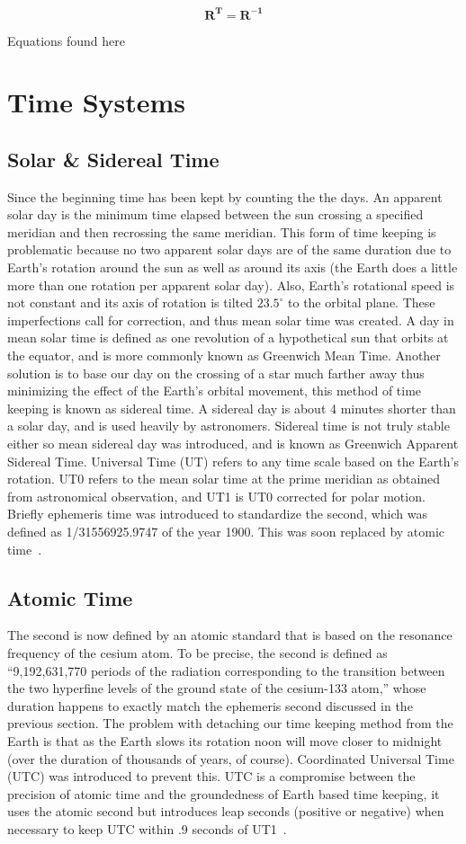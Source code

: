 \[ \mathbf{R^{T}}=\mathbf{R^{-1}} \]

Equations found  here~\cite[pp. 81-82]{battin:imma}

\section{Time Systems}
\subsection{Solar \& Sidereal Time}
Since the  beginning time has been kept by counting the the days. An apparent solar day is the minimum time elapsed between the sun crossing a specified meridian and then recrossing the same meridian. This form of time keeping is problematic because no two apparent solar days are of the same duration due to Earth's rotation around the sun as well as around its axis (the Earth does a little more than one rotation per apparent solar day). Also, Earth's rotational speed is not constant and its axis of rotation is tilted $23.5^{\circ}$ to the orbital plane. These imperfections call for correction, and thus mean solar time was created. A day in mean solar time is defined as one revolution of a hypothetical sun that orbits at the equator, and is more commonly known as Greenwich Mean Time. Another solution is to base our day on the crossing of a star much farther away thus minimizing the effect of the Earth's orbital movement, this method of time keeping is known as sidereal time. A sidereal day is about 4 minutes shorter than a solar day, and is used heavily by astronomers. Sidereal time is not truly stable either so mean sidereal day was introduced, and is known as Greenwich Apparent Sidereal Time. Universal Time (UT) refers to any time scale based on the Earth's rotation. UT0 refers to the mean solar time at the prime meridian as obtained from astronomical observation, and UT1 is UT0 corrected for polar motion. Briefly ephemeris time was introduced to standardize the second, which was defined as 1/31556925.9747 of the year 1900. This was soon replaced by atomic time~\cite[pp. 84-86]{me:gsmp}.
\subsection{Atomic Time}
The second is now defined by an atomic standard that is based on the resonance frequency of the cesium atom. To be precise, the second is defined as ``9,192,631,770 periods of the radiation corresponding to the transition between the two hyperfine levels of the ground state of the cesium-133 atom,'' whose duration happens to exactly match the ephemeris second discussed in the previous section. The problem with detaching our time keeping method from the Earth is that as the Earth slows its rotation noon will move closer to midnight (over the duration of thousands of years, of course). Coordinated Universal Time (UTC) was introduced to prevent this. UTC is a compromise between the precision of atomic time and the groundedness of Earth based time keeping, it uses the atomic second but introduces leap seconds (positive or negative) when necessary to keep UTC within .9 seconds of UT1~\cite[pp. 86-87]{me:gsmp}.

